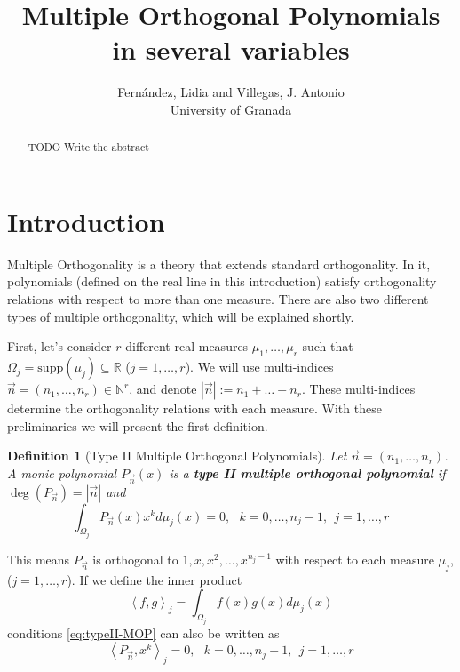 \documentclass[12pt,a4]{report}
\theoremstyle{plain}
\newtheorem{definition}[theorem]{Definition}
\newcommand{\R}[0]{\mathbb{R}}
\newcommand{\N}[0]{\mathbb{N}}
\newcommand{\supp}[0]{\mathrm{supp}}
\newcommand{\cred}[1]{{\color{red} #1}}
\newcommand{\prodesc}[2]{\left\langle #1 , #2 \right\rangle}
\begin{document}
\title{Multiple Orthogonal Polynomials in several variables}


\author{Fernández, Lidia and Villegas, J. Antonio\\
\small University of Granada}
\maketitle

\begin{abstract}
\cred{TODO Write the abstract}
\end{abstract}

\section*{Introduction}

Multiple Orthogonality is a theory that extends standard orthogonality. In it, polynomials (defined on the real line in this introduction) satisfy orthogonality relations with respect to more than one measure. There are also two different types of multiple orthogonality, which will be explained shortly.

First, let's consider $r$ different real measures $\mu_1,\dots,\mu_r$ such that $\Omega_j=\supp(\mu_j)\subseteq\R$ ($j=1,\dots,r$). We will use multi-indices $\vec n = (n_1, \dots,n_r)\in \N^r$, and denote $|\vec n| := n_1 + \dots + n_r$. These multi-indices determine the orthogonality relations with each measure. With these preliminaries we will present the first definition.

\begin{definition}[Type II Multiple Orthogonal Polynomials]
    Let $\vec n = (n_1,\dots,n_r)$. A monic polynomial $P_{\vec n}(x)$ is a \textbf{type II multiple orthogonal polynomial} if $\deg(P_{\vec n})= |\vec n|$ and 
    \begin{equation}
        \label{eq:typeII-MOP}
        \int_{\Omega_j} P_{\vec n}(x) x^k d\mu_j(x) = 0, \ \ \ k=0,\dots,n_{j}-1, \ \ j = 1,\dots,r
    \end{equation}
\end{definition}

This means $P_{\vec n}$ is orthogonal to $1,x,x^2,\dots,x^{n_j-1}$ with respect to each measure $\mu_j$, ($j=1,\dots,r$). If we define the inner product 
\begin{equation}
    \label{eq:inner-product}
    \prodesc{f}{g}_j=\int_{\Omega_j}f(x)g(x)d\mu_j(x)
\end{equation}
conditions \eqref{eq:typeII-MOP} can also be written as
\begin{equation}
    \label{eq:typeII-MOP-dot}
    \prodesc{P_{\vec n}}{x^k}_j = 0, \ \ \ k=0,\dots,n_{j}-1, \ \ j = 1,\dots,r
\end{equation}
\end{document}
